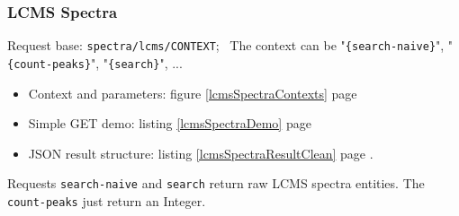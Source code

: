 \subsubsection{LCMS Spectra}
\hspace*{\parindent}
Request base: \texttt{spectra/lcms/CONTEXT};~
The context can be "\texttt{\{search-naive\}}", "\texttt{\{count-peaks\}}", "\texttt{\{search\}}", ... 
\begin{itemize}
	\item Context and parameters: \cf figure \ref{lcmsSpectraContexts} page \pageref{lcmsSpectraContexts}
	\item Simple GET demo: \cf listing \ref{lcmsSpectraDemo} page \pageref{lcmsSpectraDemo}
	\item JSON result structure: \cf listing \ref{lcmsSpectraResultClean} page \pageref{lcmsSpectraResultClean}. 
\end{itemize}
\hspace*{\parindent}
Requests \texttt{search-naive} and \texttt{search} return raw LCMS spectra entities. 
The \texttt{count-peaks} just return an Integer. 
